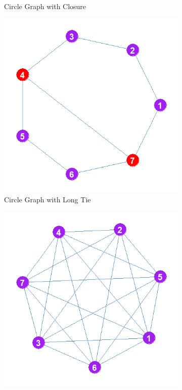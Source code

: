 \documentclass[12pt]{article}
\begin{document}
\begin{figure}
\begin{subfigure}[b]{0.3\textwidth}
            \caption{Circle Graph with Closure}
            \label{fig:circleplus}
    \end{subfigure}
    \begin{subfigure}[b]{0.3\textwidth}
        \includegraphics[width=1.0\textwidth]{Plots/Toys/circle-plus-long.png}
            \caption{Circle Graph with Long Tie}
            \label{fig:circleplus}
    \end{subfigure}
    \captionsetup[subfigure]{font=footnotesize,labelfont=footnotesize}
    \centering
    \begin{subfigure}[b]{0.3\textwidth}
        \includegraphics[width=1.0\textwidth]{Plots/Toys/clique.png}

\end{subfigure}
\end{figure}
\end{document}
